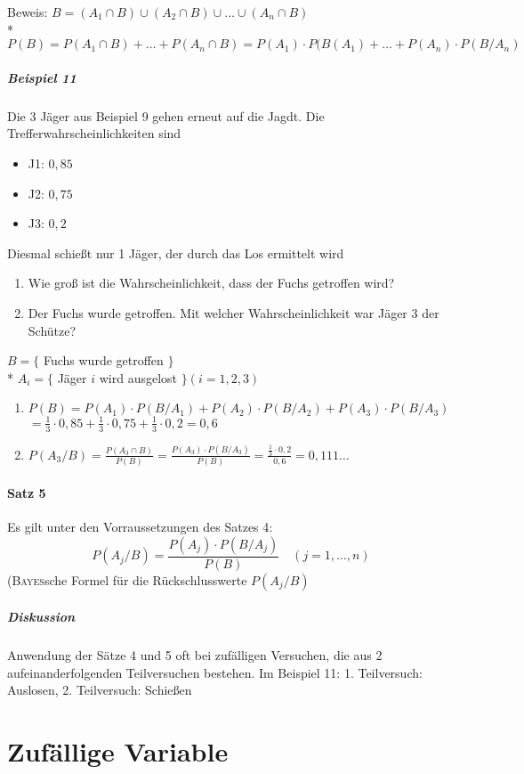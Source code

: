 \documentclass[a4paper]{scrartcl}
\begin{document}
Beweis: $B = (A_1 \cap B) \cup (A_2 \cap B) \cup \dots \cup (A_n \cap B)$\\*
$P(B) = P(A_1 \cap B) + \dots + P(A_n \cap B) = P(A_1) \cdot P(B (A_1) + \dots + P(A_n) \cdot P(B /A_n)$

\subparagraph{Beispiel 11} Die 3 Jäger aus Beispiel 9 gehen erneut auf die Jagdt. Die Trefferwahrscheinlichkeiten sind 
\begin{itemize}
\item J1: $0,85$
\item J2: $0,75$
\item J3: $0,2$
\end{itemize}
Diesmal schießt nur 1 Jäger, der durch das Los ermittelt wird
\begin{enumerate}
\item Wie groß ist die Wahrscheinlichkeit, dass der Fuchs getroffen wird?
\item Der Fuchs wurde getroffen. Mit welcher Wahrscheinlichkeit war Jäger 3 der Schütze?
\end{enumerate}
$B=\{$ Fuchs wurde getroffen $\}$\\*
$A_i = \{$ Jäger $i$ wird ausgelost $\} (i = 1,2,3)$
\begin{enumerate}
\item $P(B) = P(A_1) \cdot P(B / A_1) + P(A_2) \cdot P(B/ A_2) + P(A_3) \cdot P(B /A_3)$\\
$= \frac{1}{3}\cdot 0,85  + \frac{1}{3} \cdot 0,75 + \frac{1}{3} \cdot 0,2 = 0,6$
\item $P(A_3 / B) = \frac{P(A_3 \cap B)}{P(B)} = \frac{P(A_3 ) \cdot P(B /A_3)}{P(B)} = \frac{\frac{1}{3} \cdot 0,2 }{0,6} = 0,111\dots$
\end{enumerate}

\paragraph{Satz 5} Es gilt unter den Vorraussetzungen des Satzes 4:
\[ P(A_j /B) = \frac{P(A_j) \cdot P(B /A_j) }{P(B)} \quad (j=1,\dots,n)\]
(\textsc{Bayes}sche Formel für die Rückschlusswerte $P(A_j /B)$

\subparagraph{Diskussion} Anwendung der Sätze 4 und 5 oft bei zufälligen Versuchen, die aus 2 aufeinanderfolgenden Teilversuchen bestehen. Im Beispiel 11: 1. Teilversuch: Auslosen, 2. Teilversuch: Schießen

\section{Zufällige Variable}
\end{document}
